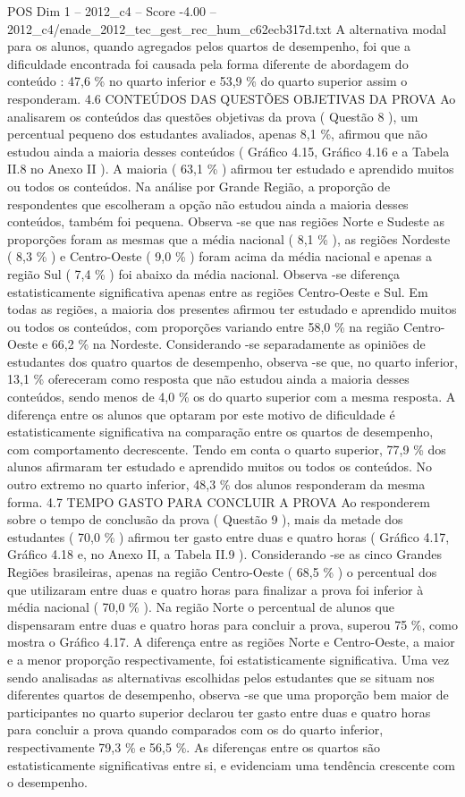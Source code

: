 \begin{textsample}{POS Dim 1 – 2012\_c4 – Score -4.00 – 2012\_c4/enade\_2012\_tec\_gest\_rec\_hum\_c62ecb317d.txt}
A alternativa modal para os alunos, quando agregados pelos quartos de desempenho, foi que a dificuldade encontrada foi causada pela forma diferente de abordagem do conteúdo : 47,6 \% no quarto inferior e 53,9 \% do quarto superior assim o responderam. 4.6 CONTEÚDOS DAS QUESTÕES OBJETIVAS DA PROVA Ao analisarem os conteúdos das questões objetivas da prova ( Questão 8 ), um percentual pequeno dos estudantes avaliados, apenas 8,1 \%, afirmou que não estudou ainda a maioria desses conteúdos ( Gráfico 4.15, Gráfico 4.16 e a Tabela II.8 no Anexo II ).
A maioria ( 63,1 \% ) afirmou ter estudado e aprendido muitos ou todos os conteúdos.
Na análise por Grande Região, a proporção de respondentes que escolheram a opção não estudou ainda a maioria desses conteúdos, também foi pequena.
Observa -se que nas regiões Norte e Sudeste as proporções foram as mesmas que a média nacional ( 8,1 \% ), as regiões Nordeste ( 8,3 \% ) e Centro-Oeste ( 9,0 \% ) foram acima da média nacional e apenas a região Sul ( 7,4 \% ) foi abaixo da média nacional.
Observa -se diferença estatisticamente significativa apenas entre as regiões Centro-Oeste e Sul.
Em todas as regiões, a maioria dos presentes afirmou ter estudado e aprendido muitos ou todos os conteúdos, com proporções variando entre 58,0 \% na região Centro-Oeste e 66,2 \% na Nordeste.
Considerando -se separadamente as opiniões de estudantes dos quatro quartos de desempenho, observa -se que, no quarto inferior, 13,1 \% ofereceram como resposta que não estudou ainda a maioria desses conteúdos, sendo menos de 4,0 \% os do quarto superior com a mesma resposta.
A diferença entre os alunos que optaram por este motivo de dificuldade é estatisticamente significativa na comparação entre os quartos de desempenho, com comportamento decrescente.
Tendo em conta o quarto superior, 77,9 \% dos alunos afirmaram ter estudado e aprendido muitos ou todos os conteúdos.
No outro extremo no quarto inferior, 48,3 \% dos alunos responderam da mesma forma. 4.7 TEMPO GASTO PARA CONCLUIR A PROVA Ao responderem sobre o tempo de conclusão da prova ( Questão 9 ), mais da metade dos estudantes ( 70,0 \% ) afirmou ter gasto entre duas e quatro horas ( Gráfico 4.17, Gráfico 4.18 e, no Anexo II, a Tabela II.9 ).
Considerando -se as cinco Grandes Regiões brasileiras, apenas na região Centro-Oeste ( 68,5 \% ) o percentual dos que utilizaram entre duas e quatro horas para finalizar a prova foi inferior à média nacional ( 70,0 \% ).
Na região Norte o percentual de alunos que dispensaram entre duas e quatro horas para concluir a prova, superou 75 \%, como mostra o Gráfico 4.17.
A diferença entre as regiões Norte e Centro-Oeste, a maior e a menor proporção respectivamente, foi estatisticamente significativa.
Uma vez sendo analisadas as alternativas escolhidas pelos estudantes que se situam nos diferentes quartos de desempenho, observa -se que uma proporção bem maior de participantes no quarto superior declarou ter gasto entre duas e quatro horas para concluir a prova quando comparados com os do quarto inferior, respectivamente 79,3 \% e 56,5 \%.
As diferenças entre os quartos são estatisticamente significativas entre si, e evidenciam uma tendência crescente com o desempenho.


\end{textsample}
